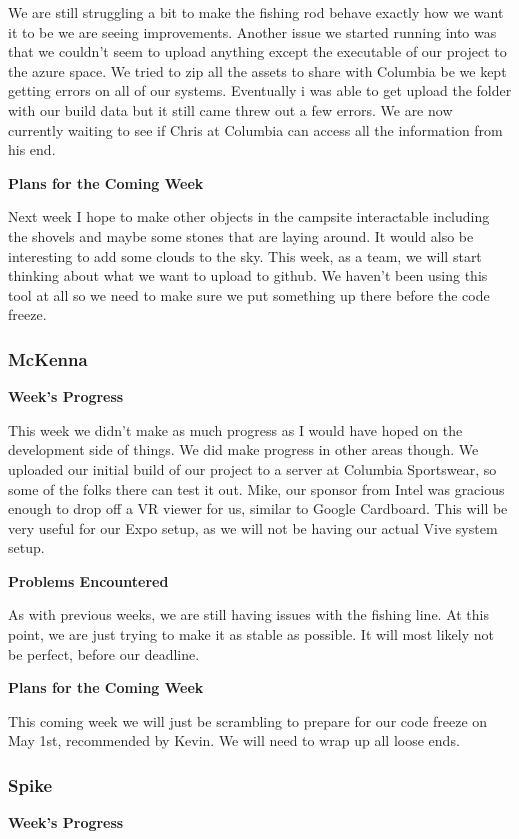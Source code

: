 \documentclass[10pt,journal,compsoc,onecolumn, draftclsnofoot]{IEEEtran}
\begin{document}
We are still struggling a bit to make the fishing rod behave exactly how we want it to be we are seeing improvements. Another issue we started running into was that we couldn't seem to upload anything except the executable of our project to the azure space. We tried to zip all the assets to share with Columbia be we kept getting errors on all of our systems. Eventually i was able to get upload the folder with our build data but it still came threw out a few errors. We are now currently waiting to see if Chris at Columbia can access all the information from his end.

\noindent \textbf{Plans for the Coming Week}

Next week I hope to make other objects in the campsite interactable including the shovels and maybe some stones that are laying around. It would also be interesting to add some clouds to the sky. This week, as a team, we will start thinking about what we want to upload to github. We haven't been using this tool at all so we need to make sure we put something up there before the code freeze.

\subsubsection{McKenna}
\noindent \textbf{Week's Progress}

This week we didn't make as much progress as I would have hoped on the development side of things. We did make progress in other areas though. We uploaded our initial build of our project to a server at Columbia Sportswear, so some of the folks there can test it out. Mike, our sponsor from Intel was gracious enough to drop off a VR viewer for us, similar to Google Cardboard. This will be very useful for our Expo setup, as we will not be having our actual Vive system setup.

\noindent \textbf{Problems Encountered}

As with previous weeks, we are still having issues with the fishing line. At this point, we are just trying to make it as stable as possible. It will most likely not be perfect, before our deadline.

\noindent \textbf{Plans for the Coming Week}

This coming week we will just be scrambling to prepare for our code freeze on May 1st, recommended by Kevin. We will need to wrap up all loose ends.

\subsubsection{Spike}
\noindent \textbf{Week's Progress}
\end{document}
